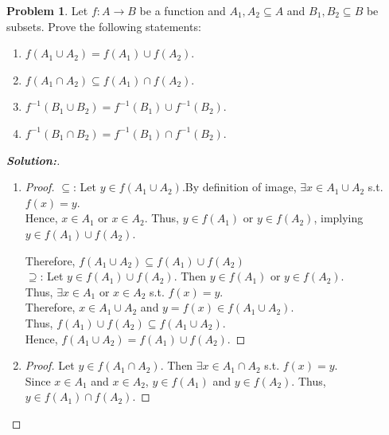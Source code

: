 \documentclass[12pt]{article}
\theoremstyle{definition}\newtheorem{problem}{Problem}
\newenvironment{solution}{\begin{proof}[\bfseries\textup{Solution:}]}{\end{proof}}
\begin{document}
\newpage
\begin{problem}
Let $f:A\to B$ be a function and $A_1,A_2\subseteq A$ and $B_1,B_2\subseteq B$ be subsets.  Prove the following statements:
\begin{enumerate}
\item $f(A_1\cup A_2) = f(A_1) \cup f(A_2)$.
\item $f(A_1\cap A_2) \subseteq f(A_1) \cap f(A_2)$.
\item $f^{-1}(B_1\cup B_2) = f^{-1}(B_1) \cup f^{-1}(B_2)$.
\item $f^{-1}(B_1\cap B_2) = f^{-1}(B_1) \cap f^{-1}(B_2)$.
\end{enumerate}
\end{problem}
\begin{solution}
    \begin{enumerate}
        \item 
        
        \begin{proof}
            \(\subseteq\): Let \( y \in f(A_1 \cup A_2) \).By definition of image, \(\exists x \in A_1 \cup A_2\) s.t. \( f(x) = y \). \\
            Hence, \( x \in A_1 \) or \( x \in A_2 \). Thus, \( y \in f(A_1) \) or \( y \in f(A_2) \), implying \( y \in f(A_1) \cup f(A_2) \).

            Therefore, $ f(A_1 \cup A_2) \subseteq f(A_1) \cup f(A_2)$ 
            \\

            \(\supseteq\): Let \( y \in f(A_1) \cup f(A_2) \). Then \( y \in f(A_1) \) or \( y \in f(A_2) \). \\
            Thus, \(\exists x \in A_1\) or \( x \in A_2 \) s.t. \( f(x) = y \). \\
            Therefore, \( x \in A_1 \cup A_2 \) and \( y = f(x) \in f(A_1 \cup A_2) \).\\
            Thus, \(f(A_1) \cup f(A_2) \subseteq f(A_1 \cup A_2)\).\\

            Hence, \( f(A_1 \cup A_2) = f(A_1) \cup f(A_2) \).
        \end{proof}
        \bigbreak
        
        \item 
        
        \begin{proof}
            Let \( y \in f(A_1 \cap A_2) \). Then \(\exists x \in A_1 \cap A_2\) s.t. \( f(x) = y \). \\
            Since \( x \in A_1 \) and \( x \in A_2 \), \( y \in f(A_1) \) and \( y \in f(A_2) \). Thus, \( y \in f(A_1) \cap f(A_2) \).
            

\end{proof}
\end{enumerate}
\end{solution}
\end{document}
